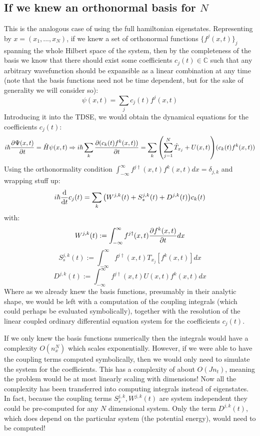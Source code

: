 \documentclass[11pt, a4paper]{article} %
\newcommand{\C}{\mathbb{C}}
\begin{document}
\subsection{If we knew an orthonormal basis for $N$}
This is the analogous case of using the full hamiltonian eigenstates. Representing by $x=(x_1,...,x_N)$, if we knew a set of orthonormal functions $\{f^j(x,t)\}_j$ spanning the whole Hilbert space of the system, then by the completeness of the basis we know that there should exist some coefficients $c_j(t)\in \C$ such that any arbitrary wavefunction should be expansible as a linear combination at any time (note that the basis functions need not be time dependent, but for the sake of generality we will consider so):
\begin{equation}
\psi(x,t)=\sum_j c_j(t) f^j(x,t)
\end{equation}
Introducing it into the TDSE, we would obtain the dynamical equations for the coefficients $c_j(t)$:
\begin{equation}
i\hbar \pdv{\Psi(x,t)}{t}=\hat{H}\psi(x,t)\Rightarrow i\hbar \sum_k\pdv{(c_k(t)f^k(x,t))}{t}=\sum_k\qty(\sum_{j=1}^N \hat{T}_{x_j} + U(x, t))(c_k(t)f^k(x,t))
\end{equation}
Using the orthonormality condition $\int_{-\infty}^{\infty}f^{j\dagger}(x,t)f^k(x,t)dx=\delta_{j,k}$ and wrapping stuff up:
\begin{equation}
i\hbar\dv{}{t}c_j(t)=\sum_k\qty(W^{j,k}(t)+S^{j,k}_s(t)+D^{j,k}(t))c_k(t)
\end{equation}
with:
\begin{equation}
W^{j,k}(t):=\int_{-\infty}^{\infty}f^{j\dagger}(x,t) \pdv{f^k(x,t)}{t} dx
\end{equation}
\begin{equation}
S^{j,k}_s(t):=\int_{-\infty}^{\infty}f^{j\dagger}(x,t) T_{x_j}[f^k(x,t)] dx
\end{equation}
\begin{equation}
D^{j,k}(t):=\int_{-\infty}^{\infty}f^{j\dagger}(x,t) U(x,t)f^k(x,t) dx
\end{equation}
Where as we already knew the basis functions, presumably in their analytic shape, we would be left with a computation of the coupling integrals (which could perhaps be evaluated symbolically), together with the resolution of the linear coupled ordinary differential equation system for the coefficients $c_j(t)$.

If we only knew the basis functions numerically then the integrals would have a complexity $O(n_x^N)$ which scales exponentially. However, if we were able to have the coupling terms computed symbolically, then we would only need to simulate the system for the coefficients. This has a complexity of about $O(Jn_t)$, meaning the problem would be at most linearly scaling with dimensions! Now all the complexity has been transferred into computing integrals instead of eigenstates. In fact, because the coupling terms $S^{j,k}_s, W^{j,k}(t)$ are system independent they could be pre-computed for any $N$ dimensional system. Only the term $D^{j,k}(t)$, which does depend on the particular system (the potential energy), would need to be computed!
\end{document}
